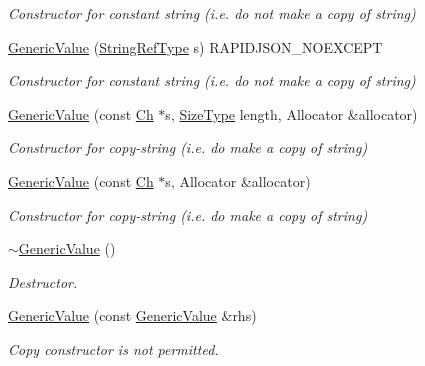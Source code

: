 \begin{DoxyCompactItemize}
\begin{DoxyCompactList}\small\item\em Constructor for constant string (i.\+e. do not make a copy of string) \end{DoxyCompactList}\item 
\hyperlink{class_generic_value_abb2887958974fef1b2b5c8e32cc72ddb}{Generic\+Value} (\hyperlink{class_generic_value_a32e0f30ee278072374c8168b14d3317f}{String\+Ref\+Type} s) R\+A\+P\+I\+D\+J\+S\+O\+N\+\_\+\+N\+O\+E\+X\+C\+E\+PT\hypertarget{class_generic_value_abb2887958974fef1b2b5c8e32cc72ddb}{}\label{class_generic_value_abb2887958974fef1b2b5c8e32cc72ddb}

\begin{DoxyCompactList}\small\item\em Constructor for constant string (i.\+e. do not make a copy of string) \end{DoxyCompactList}\item 
\hyperlink{class_generic_value_a9ec2c7cda8c8845acfa3565c6b1b4e10}{Generic\+Value} (const \hyperlink{class_generic_value_ade0e0ce64ccd5d852da57a35e720bafb}{Ch} $\ast$s, \hyperlink{rapidjson_8h_a5ed6e6e67250fadbd041127e6386dcb5}{Size\+Type} length, Allocator \&allocator)\hypertarget{class_generic_value_a9ec2c7cda8c8845acfa3565c6b1b4e10}{}\label{class_generic_value_a9ec2c7cda8c8845acfa3565c6b1b4e10}

\begin{DoxyCompactList}\small\item\em Constructor for copy-\/string (i.\+e. do make a copy of string) \end{DoxyCompactList}\item 
\hyperlink{class_generic_value_a9b72b2e3347d4cd77b16c3b45e8decf1}{Generic\+Value} (const \hyperlink{class_generic_value_ade0e0ce64ccd5d852da57a35e720bafb}{Ch} $\ast$s, Allocator \&allocator)\hypertarget{class_generic_value_a9b72b2e3347d4cd77b16c3b45e8decf1}{}\label{class_generic_value_a9b72b2e3347d4cd77b16c3b45e8decf1}

\begin{DoxyCompactList}\small\item\em Constructor for copy-\/string (i.\+e. do make a copy of string) \end{DoxyCompactList}\item 
\hyperlink{class_generic_value_a213ba89ef5ef961a5e655bd8c78ac9f4}{$\sim$\+Generic\+Value} ()
\begin{DoxyCompactList}\small\item\em Destructor. \end{DoxyCompactList}\item 
\hyperlink{class_generic_value_ac5bfd54b6bdea215716df69c501d5cf3}{Generic\+Value} (const \hyperlink{class_generic_value}{Generic\+Value} \&rhs)\hypertarget{class_generic_value_ac5bfd54b6bdea215716df69c501d5cf3}{}\label{class_generic_value_ac5bfd54b6bdea215716df69c501d5cf3}

\begin{DoxyCompactList}\small\item\em Copy constructor is not permitted. \end{DoxyCompactList}\end{DoxyCompactItemize}


